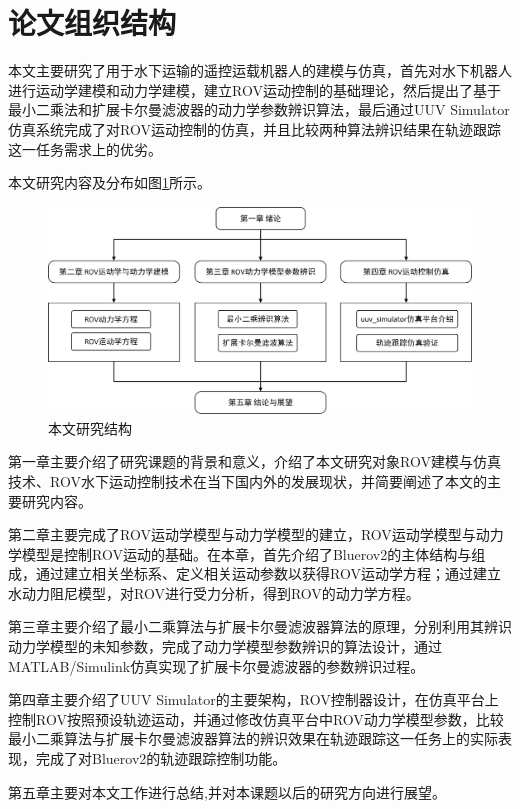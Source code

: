 \section{论文组织结构}

本文主要研究了用于水下运输的遥控运载机器人的建模与仿真，首先对水下机器人进行运动学建模和动力学建模，建立ROV运动控制的基础理论，然后提出了基于最小二乘法和扩展卡尔曼滤波器的动力学参数辨识算法，最后通过UUV Simulator仿真系统完成了对ROV运动控制的仿真，并且比较两种算法辨识结果在轨迹跟踪这一任务需求上的优劣。

本文研究内容及分布如图\ref{f.thesis_framework}所示。

\begin{figure}[hbt]
    \centering
    \includegraphics[width=\linewidth]{images/chapter1/论文架构图.png}
    \caption{本文研究结构}
    \label{f.thesis_framework}
\end{figure}

第一章主要介绍了研究课题的背景和意义，介绍了本文研究对象ROV建模与仿真技术、ROV水下运动控制技术在当下国内外的发展现状，并简要阐述了本文的主要研究内容。

第二章主要完成了ROV运动学模型与动力学模型的建立，ROV运动学模型与动力学模型是控制ROV运动的基础。在本章，首先介绍了Bluerov2的主体结构与组成，通过建立相关坐标系、定义相关运动参数以获得ROV运动学方程；通过建立水动力阻尼模型，对ROV进行受力分析，得到ROV的动力学方程。

第三章主要介绍了最小二乘算法与扩展卡尔曼滤波器算法的原理，分别利用其辨识动力学模型的未知参数，完成了动力学模型参数辨识的算法设计，通过MATLAB/Simulink仿真实现了扩展卡尔曼滤波器的参数辨识过程。

第四章主要介绍了UUV Simulator的主要架构，ROV控制器设计，在仿真平台上控制ROV按照预设轨迹运动，并通过修改仿真平台中ROV动力学模型参数，比较最小二乘算法与扩展卡尔曼滤波器算法的辨识效果在轨迹跟踪这一任务上的实际表现，完成了对Bluerov2的轨迹跟踪控制功能。

第五章主要对本文工作进行总结,并对本课题以后的研究方向进行展望。

\newpage